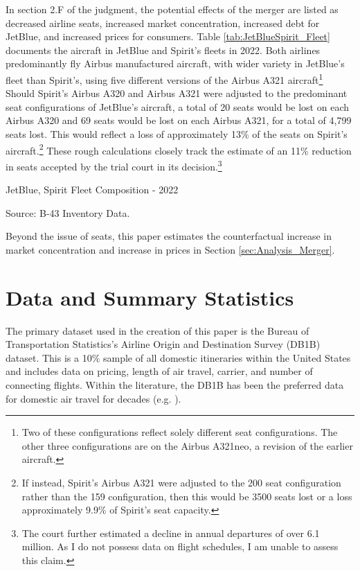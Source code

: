 \documentclass{article}
\begin{document}
	In section 2.F of the judgment, the potential effects of the merger are listed as decreased airline seats, increased market concentration, increased debt for JetBlue, and increased prices for consumers. Table \ref{tab:JetBlueSpirit_Fleet} documents the aircraft in JetBlue and Spirit's fleets in 2022. Both airlines predominantly fly Airbus manufactured aircraft, with wider variety in JetBlue's fleet than Spirit's, using five different versions of the Airbus A321 aircraft\footnote{Two of these configurations reflect solely different seat configurations. The other three configurations are on the Airbus A321neo, a revision of the earlier aircraft.} Should Spirit's Airbus A320 and Airbus A321 were adjusted to the predominant seat configurations of JetBlue's aircraft, a total of 20 seats would be lost on each Airbus A320 and 69 seats would be lost on each Airbus A321, for a total of 4,799 seats lost. This would reflect a loss of approximately 13\% of the seats on Spirit's aircraft.\footnote{If instead, Spirit's Airbus A321 were adjusted to the 200 seat configuration rather than the 159 configuration, then this would be 3500 seats lost or a loss approximately 9.9\% of Spirit's seat capacity.} These rough calculations closely track the estimate of an 11\% reduction in seats accepted by the trial court in its decision.\footnote{The court further estimated a decline in annual departures of over 6.1 million. As I do not possess data on flight schedules, I am unable to assess this claim.} 
    
    \begin{table}
        \begin{center}
            \caption{JetBlue, Spirit Fleet Composition - 2022}
            \label{tab:JetBlueSpirit_Fleet}
            \vspace{-10mm}
            
        \end{center}
        \footnotesize{Source: B-43 Inventory Data. }
    \end{table}

    Beyond the issue of seats, this paper estimates the counterfactual increase in market concentration and increase in prices in Section \ref{sec:Analysis_Merger}. 

	\section{Data and Summary Statistics}
	\label{sec:Data}
	The primary dataset used in the creation of this paper is the Bureau of Transportation Statistics's Airline Origin and Destination Survey (DB1B) dataset. This is a 10\% sample of all domestic itineraries within the United States and includes data on pricing, length of air travel, carrier, and number of connecting flights. Within the literature, the DB1B has been the preferred data for domestic air travel for decades (e.g.  \citet{ciliberto_market_2021, berry_tracing_2010, goolsbee_how_2008, peters_evaluating_2006}). 
	
\end{document}
